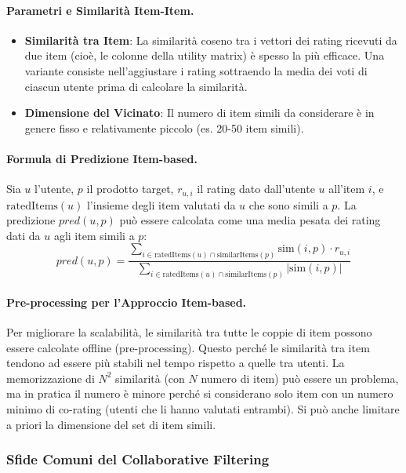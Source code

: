 \documentclass{article}
\begin{document}
\paragraph{Parametri e Similarità Item-Item.}
\begin{itemize}
    \item \textbf{Similarità tra Item}: La similarità coseno tra i vettori dei rating ricevuti da due item (cioè, le colonne della utility matrix) è spesso la più efficace. Una variante consiste nell'aggiustare i rating sottraendo la media dei voti di ciascun utente prima di calcolare la similarità.
    \item \textbf{Dimensione del Vicinato}: Il numero di item simili da considerare è in genere fisso e relativamente piccolo (es. 20-50 item simili).
\end{itemize}

\paragraph{Formula di Predizione Item-based.}
Sia $u$ l'utente, $p$ il prodotto target, $r_{u,i}$ il rating dato dall'utente $u$ all'item $i$, e $\text{ratedItems}(u)$ l'insieme degli item valutati da $u$ che sono simili a $p$. La predizione $pred(u,p)$ può essere calcolata come una media pesata dei rating dati da $u$ agli item simili a $p$:
$$ pred(u,p) = \frac{\sum_{i \in \text{ratedItems}(u) \cap \text{similarItems}(p)} \text{sim}(i,p) \cdot r_{u,i}}{\sum_{i \in \text{ratedItems}(u) \cap \text{similarItems}(p)} |\text{sim}(i,p)|} $$

\paragraph{Pre-processing per l'Approccio Item-based.}
Per migliorare la scalabilità, le similarità tra tutte le coppie di item possono essere calcolate offline (pre-processing). Questo perché le similarità tra item tendono ad essere più stabili nel tempo rispetto a quelle tra utenti.
La memorizzazione di $N^2$ similarità (con $N$ numero di item) può essere un problema, ma in pratica il numero è minore perché si considerano solo item con un numero minimo di co-rating (utenti che li hanno valutati entrambi). Si può anche limitare a priori la dimensione del set di item simili.

\subsubsection{Sfide Comuni del Collaborative Filtering}
\end{document}
